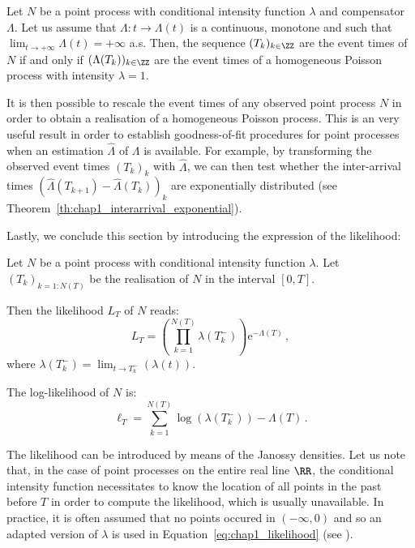 \begin{theorem}{\parencite[Theorem 7.4.IV]{DaleyV1}}

    Let $N$ be a point process with conditional intensity function $\lambda$ and compensator $\Lambda$.
    Let us assume that $\Lambda:t\to \Lambda(t)$ is a continuous, monotone and such that $\lim_{t\to+\infty}\Lambda(t) = +\infty$ a.s.
    Then, the sequence $(T_k)_{k\in\ZZ}$ are the event times of $N$ if and only if $(\Lambda(T_k))_{k\in\ZZ}$ are the event times of a homogeneous Poisson process with intensity $\lambda=1$.
\end{theorem}
It is then possible to rescale the event times of any observed point process $N$ in order to obtain a realisation of a homogeneous Poisson process.
This is an very useful result in order to establish goodness-of-fit procedures for point processes when an estimation $\hat \Lambda$ of $\Lambda$ is available.
For example, by transforming the observed event times $(T_k)_k$ with $\hat \Lambda$, we can then test whether the inter-arrival times $(\hat \Lambda(T_{k+1}) - \hat \Lambda(T_k))_k$ are exponentially distributed (see Theorem~\ref{th:chap1_interarrival_exponential}).

Lastly, we conclude this section by introducing the expression of the likelihood:

\begin{proposition}{\parencite[Theorem 7.2.III]{DaleyV1}}

    Let $N$ be a point process with conditional intensity function $\lambda$.
    Let $(T_k)_{k=1:N(T)}$ be the realisation of $N$ in the interval $[0, T]$.
    
    Then the likelihood $L_T$ of $N$ reads:
    \begin{equation}\label{eq:chap1_likelihood}
        L_T = \left(\prod_{k=1}^{N(T)}{\lambda(T_k^-)}\right)\mathrm{e}^{-\Lambda(T)}\,,
    \end{equation}
    where $\lambda(T_k^-) = \lim_{t\to T_k^-}(\lambda(t))$.

    The log-likelihood of $N$ is:
    \begin{equation}\label{eq:chap1_loglikelihood}
        \ell_T = \sum_{k=1}^{N(T)}{\log(\lambda(T_k^-))} - \Lambda(T)\,.
    \end{equation}
\end{proposition}
The likelihood can be introduced by means of the Janossy densities.
Let us note that, in the case of point processes on the entire real line $\RR$, the conditional intensity function necessitates to know the location of all points in the past before $T$ in order to compute the likelihood, which is usually unavailable.
In practice, it is often assumed that no points occured in $(-\infty, 0)$ and so an adapted version of $\lambda$ is used in Equation~\ref{eq:chap1_likelihood} (see \textcite{Ogata1978}).

